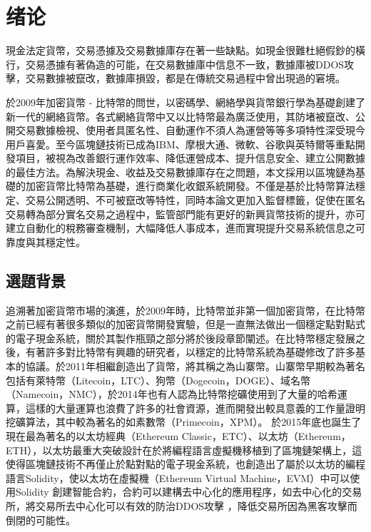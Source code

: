 
\chapter{绪论}

	現金法定貨幣，交易憑據及交易數據庫存在著一些缺點。如現金很難杜絕假鈔的橫行，交易憑據有著偽造的可能，在交易數據庫中信息不一致，數據庫被DDOS攻擊，交易數據被竄改，數據庫損毀，都是在傳統交易過程中曾出現過的窘境。

	於2009年加密貨幣 - 比特幣的問世，以密碼學、網絡學與貨幣銀行學為基礎創建了新一代的網絡貨幣。各式網絡貨幣中又以比特幣最為廣泛使用，其防堵被竄改、公開交易數據檢視、使⽤者具匿名性、⾃動運作不須⼈為運營等等多項特性深受現今用戶喜愛。至今區塊鏈技術已成為IBM、摩根大通、微軟、谷歌與英特爾等重點開發項目，被視為改善銀行運作效率、降低運營成本、提升信息安全、建立公開數據的最佳方法。為解決現金、收益及交易數據庫存在之問題，本文採用以區塊鏈為基礎的加密貨幣比特幣為基礎，進行商業化收銀系統開發。不僅是基於⽐特幣算法穩定、交易公開透明、不可被竄改等特性，同時本論⽂更加⼊監督標籤，促使在匿名交易轉為部分實名交易之過程中，監管部⾨能有更好的新興貨幣技術的提升，亦可建立自動化的稅務審查機制，大幅降低人事成本，進而實現提升交易系統信息之可靠度與其穩定性。

	\section{選題背景}

		追溯著加密貨幣市場的演進，於2009年時，比特幣並非第一個加密貨幣，在比特幣之前已經有著很多類似的加密貨幣開發實驗，但是一直無法做出一個穩定點對點式的電子現金系統，關於其製作瓶頸之部分將於後段章節闡述。在比特幣穩定發展之後，有著許多對比特幣有興趣的研究者，以穩定的比特幣系統為基礎修改了許多基本的協議。於2011年相繼創造出了貨幣，將其稱之為⼭寨幣。山寨幣早期較為著名包括有萊特幣（Litecoin，LTC）\supercite{litecoin}、狗幣（Dogecoin，DOGE）\supercite{dogecoin}、域名幣（Namecoin，NMC）\supercite{namecoin}，於2014年也有人認為比特幣挖礦使用到了大量的哈希運算，這樣的大量運算也浪費了許多的社會資源，進而開發出較具意義的工作量證明挖礦算法，其中較為著名的如素數幣（Primecoin，XPM）\supercite{primecoin}。 於2015年底也誕生了現在最為著名的以太坊經典（Ethereum Classic，ETC）\supercite{ethereumclassic}、以太坊（Ethereum，ETH）\supercite{ethereum}，以太坊最重⼤突破設計在於將編程語⾔虛擬機移植到了區塊鏈架構上，這使得區塊鏈技術不再僅止於點對點的電⼦現⾦系統，也創造出了屬於以太坊的編程語言Solidity\supercite{solidity}，使以太坊在虛擬機（Ethereum Virtual Machine，EVM）\supercite{Ethereum:Asecuredecentralisedgeneralisedtransactionledger}中可以使⽤Solidity 創建智能合約，合約可以建構去中心化的應用程序，如去中心化的交易所，將交易所去中心化可以有效的防治DDOS攻擊 \supercite{Bitcoin:Economicstechnologyandgovernance}，降低交易所因為黑客攻擊而倒閉的可能性。
		

